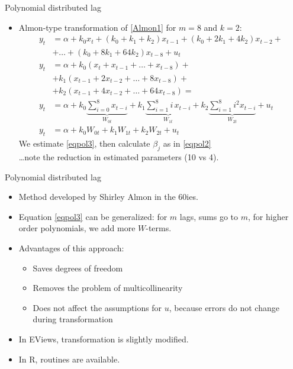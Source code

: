 \documentclass{beamer}
\begin{document}

\begin{frame}{Polynomial distributed lag}
\begin{itemize}
\item Almon-type transformation of \eqref{Almon1} for $m=8$ and $k=2$:
\begin{align} \nonumber
y_t & =  \alpha + k_0 x_t + (k_0 + k_1 + k_2)x_{t-1} + (k_0 + 2k_1 + 4k_2)x_{t-2} + \\ & + \dots + (k_0 + 8k_1 + 64k_2)x_{t-8}+u_t 
\\ \nonumber
y_t & = \alpha + k_0 (x_t + x_{t-1} + \dots + x_{t-8}) + \\ \nonumber & +  k_1(x_{t-1} + 2 x_{t-2} + \dots + 8 x_{t-8}) + \\ \nonumber & + k_2(x_{t-1} + 4x_{t-2} + \dots + 64x_{t-8}) = \\ 
y_t & = \alpha + k_0 \underbrace{\sum_{i=0}^8 x_{t-i}}_{W_{0t}} + k_1 \underbrace{\sum_{i=1}^8 i\, x_{t-i}}_{W_{1t}}  + k_2 \underbrace{\sum_{i=1}^8 i^2 x_{t-i}}_{W_{2t}}  + u_t\\
y_t & = \alpha + k_0 W_{0t} + k_1 W_{1t} + k_2 W_{2t} + u_t \label{eqpol3}
\end{align}
We estimate \eqref{eqpol3}, then calculate $\beta_j$ as in \eqref{eqpol2}\\
\dots note the reduction in estimated parameters (10 vs 4).
\end{itemize}
\end{frame}


\begin{frame}{Polynomial distributed lag}

\begin{itemize}
\item Method developed by Shirley Almon in the 60ies.
\item Equation \eqref{eqpol3} can be generalized: for $m$ lags, sums go to $m$, for higher order polynomials, we add more $W$-terms.
\vspace{0.3cm}
\item Advantages of this approach:
\begin{itemize}
\item Saves degrees of freedom
 \item Removes the problem of multicollinearity
 \item Does not affect the assumptions for $u$, because errors do not change during transformation
\end{itemize}
\vspace{0.3cm}
\item In EViews, transformation is slightly modified.
\item In R, routines are available.

\end{itemize}
\end{frame}
\end{document}

